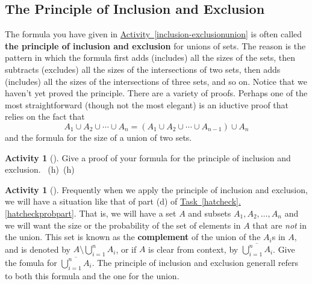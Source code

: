 \documentclass[10pt,]{book}
\newcommand{\terminology}[1]{\textbf{#1}}
\theoremstyle{plain}
\theoremstyle{definition}
\theoremstyle{definition}
\theoremstyle{definition}
\newtheorem{activity}[project]{Activity}
\numberwithin{equation}{chapter}
\begin{document}
\subsection[{The Principle of Inclusion and Exclusion}]{The Principle of Inclusion and Exclusion}\label{subsection-28}
\hypertarget{p-1197}{}%
The formula you have given in \hyperref[inclusion-exclusionunion]{Activity~\ref{inclusion-exclusionunion}} is often called \terminology{the principle of inclusion and exclusion} for unions of sets. The reason is the pattern in which the formula first adds (includes) all the sizes of the sets, then subtracts (excludes) all the sizes of the intersections of two sets, then adds (includes) all the sizes of the intersections of three sets, and so on.   Notice that we haven't yet proved the principle. There are a variety of proofs.  Perhaps one of the most straightforward (though not the most elegant) is an iductive proof that relies on the fact that%
\begin{equation*}
A_1 \cup A_2 \cup \cdots \cup A_n = \left(A_1 \cup A_2 \cup \cdots \cup A_{n-1}\right) \cup A_n
\end{equation*}
and the formula for the size of a union of two sets.%
\begin{activity}[]\label{activity-216}
\hypertarget{p-1198}{}%
Give a proof of your formula for the principle of inclusion and exclusion.%
~{\tiny (h)}~{\tiny (h)}\end{activity}
\begin{activity}[]\label{compunion}
\hypertarget{p-1202}{}%
Frequently when we apply the principle of inclusion and exclusion, we will have a situation like that of part (d) of \hyperref[hatcheckprobpart]{Task~\ref{hatcheck}.\ref{hatcheckprobpart}}.  That is, we will have a set \(A\) and subsets \(A_1, A_2, \ldots, A_n\) and we will want the size or the probability of the set of elements in \(A\) that are \emph{not} in the union.  This set is known as the \terminology{complement}  of the union of the \(A_i\)s in \(A\), and is denoted by \(A \setminus \bigcup_{i=1}^n A_i\), or if \(A\) is clear from context, by \(\overline{\bigcup_{i=1}^n A_i}\). Give the fomula for \(\overline{\bigcup_{i=1}^n A_i}\).  The principle of inclusion and exclusion generall refers to both this formula and the one for the union.%
\end{activity}
\hypertarget{p-1204}{}%
\end{document}
